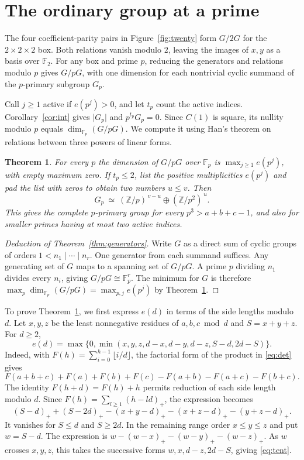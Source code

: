 \documentclass[11pt]{article}
\newtheorem{theorem}{Theorem}
\newcommand{\Z}{\mathbb Z}
\newcommand{\F}{\mathbb F}
\begin{document}
\section{The ordinary group at a prime}\label{sec:ordinary}

The four coefficient-parity pairs in Figure~\ref{fig:twenty} form
\(G/2G\) for the \(2\times2\times2\) box. Both relations vanish modulo
\(2\), leaving the images of \(x,y\) as a basis over \(\F_2\).
For any box and prime \(p\), reducing the generators and relations modulo \(p\) gives
\(G/pG\), with one dimension for each nontrivial cyclic summand of
the \(p\)-primary subgroup \(G_p\).

Call \(j\ge1\) active if \(e(p^j)>0\), and let \(t_p\) count the active
indices. Corollary~\ref{cor:int} gives \(\lvert G_p\rvert\) and
\(p^{t_p}G_p=0\). Since \(C(1)\) is square, its nullity modulo \(p\)
equals \(\dim_{\F_p}(G/pG)\). We compute it using Han's theorem on
relations between three powers of linear forms.

\begin{theorem}\label{thm:ordinary}
For every \(p\) the dimension of \(G/pG\) over \(\F_p\) is
\(\max_{j\ge1} e(p^j)\), with empty maximum zero. If \(t_p\le2\),
list the positive multiplicities \(e(p^j)\) and pad the list with zeros
to obtain two numbers \(u\le v\). Then
\[
          G_p \ \simeq\ (\Z/p)^{\,v-u}\oplus(\Z/p^2)^{\,u}.
\]
This gives the complete \(p\)-primary group for every
\(p^3>a+b+c-1\), and also for smaller primes having at most two active
indices.
\end{theorem}

\begin{proof}[Deduction of Theorem~\ref{thm:generators}]
Write \(G\) as a direct sum of cyclic groups of orders \(1<n_1\mid\cdots\mid n_r\).
One generator from each summand suffices. Any generating set of \(G\)
maps to a spanning set of \(G/pG\). A prime \(p\) dividing \(n_1\) divides
every \(n_i\), giving \(G/pG\cong\F_p^r\). The minimum for \(G\) is
therefore \(\max_p\dim_{\F_p}(G/pG)=\max_{p,j} e(p^j)\) by
Theorem~\ref{thm:ordinary}.
\end{proof}

To prove Theorem~\ref{thm:ordinary}, we first express \(e(d)\) in
terms of the side lengths modulo \(d\). Let
\(x,y,z\) be the least nonnegative residues of \(a,b,c\bmod d\) and
\(S=x+y+z\). For \(d\ge2\),
\begin{equation}\label{eq:tent}
 e(d)=\max\{0,\min(x,y,z,d-x,d-y,d-z,S-d,2d-S)\}.
\end{equation}
Indeed, with \(F(h)=\sum_{i=0}^{h-1}\lfloor i/d\rfloor\), the
factorial form of the product in \eqref{eq:det} gives
\[
 F(a+b+c)+F(a)+F(b)+F(c)-F(a+b)-F(a+c)-F(b+c).
\]
The identity \(F(h+d)=F(h)+h\) permits reduction of each side length
modulo \(d\). Since \(F(h)=\sum_{l\ge1}(h-ld)_+\), the expression becomes
\[
 (S-d)_++(S-2d)_+-(x+y-d)_+-(x+z-d)_+-(y+z-d)_+.
\]
It vanishes for \(S\le d\) and \(S\ge2d\). In the remaining range order
\(x\le y\le z\) and put \(w=S-d\). The expression is
\(w-(w-x)_+-(w-y)_+-(w-z)_+\). As \(w\) crosses \(x,y,z\), this takes
the successive forms \(w,x,d-z,2d-S\), giving \eqref{eq:tent}.
\end{document}
